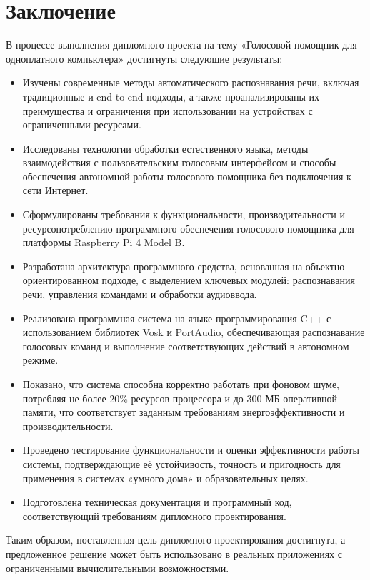\section*{Заключение}

В процессе выполнения дипломного проекта на тему «Голосовой помощник для одноплатного компьютера» достигнуты следующие результаты:

\begin{itemize}
	\item Изучены современные методы автоматического распознавания речи, включая традиционные и end-to-end подходы, а также проанализированы их преимущества и ограничения при использовании на устройствах с ограниченными ресурсами.
	\item Исследованы технологии обработки естественного языка, методы взаимодействия с пользовательским голосовым интерфейсом и способы обеспечения автономной работы голосового помощника без подключения к сети Интернет.
	\item Сформулированы требования к функциональности, производительности и ресурсопотреблению программного обеспечения голосового помощника для платформы Raspberry Pi 4 Model B.
	\item Разработана архитектура программного средства, основанная на объектно-ориентированном подходе, с выделением ключевых модулей: распознавания речи, управления командами и обработки аудиоввода.
	\item Реализована программная система на языке программирования C++ с использованием библиотек Vosk и PortAudio, обеспечивающая распознавание голосовых команд и выполнение соответствующих действий в автономном режиме.
	\item Показано, что система способна корректно работать при фоновом шуме, потребляя не более 20\% ресурсов процессора и до 300 МБ оперативной памяти, что соответствует заданным требованиям энергоэффективности и производительности.
	\item Проведено тестирование функциональности и оценки эффективности работы системы, подтверждающие её устойчивость, точность и пригодность для применения в системах «умного дома» и образовательных целях.
	\item Подготовлена техническая документация и программный код, соответствующий требованиям дипломного проектирования.
\end{itemize}

Таким образом, поставленная цель дипломного проектирования достигнута, а предложенное решение может быть использовано в реальных приложениях с ограниченными вычислительными возможностями.


